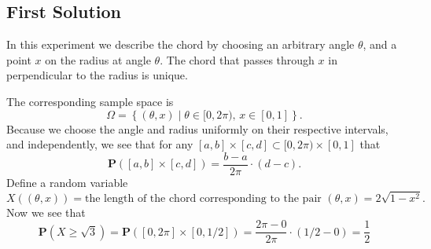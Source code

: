 \documentclass[11pt,a4paper]{article}
\theoremstyle{definition}
\theoremstyle{plain}
\newcommand{\set}[2]{ \left\{ #1 \mid #2 \right\} }
\begin{document}
  \subsection{First Solution}
    In this experiment we describe the chord by choosing an arbitrary angle
    $\theta$, and a point $x$ on the radius at angle $\theta$. The chord
    that passes through $x$ in perpendicular to the radius is unique.
    \begin{center}
    \end{center}
    The corresponding sample space is
    \[
      \Omega = \set{(\theta, x)}{ \theta \in [0, 2 \pi),\, x \in [0,1]}.
    \]
    Because we choose the angle and radius uniformly on their respective
    intervals, and independently, we see that for any 
    $[a,b] \times [c,d] \subset [0, 2 \pi) \times [0,1]$ that
    \[
      \mathbf P([a,b] \times [c,d]) = \frac{b-a}{2 \pi} \cdot (d-c).
    \]
    Define a random variable
    \[
      X\left((\theta, x)\right) = \text{the length of the chord corresponding
      to the pair $(\theta, x)$} = 2 \sqrt{1 - x^2}.
    \]
    Now we see that
    \[
      \mathbf P\left(X \geq \sqrt{3}\right) = 
      \mathbf P([0,2 \pi] \times [0,1/2]) =
      \frac{2 \pi-0}{2 \pi} \cdot (1/2-0) =
      \frac{1}{2}
    \]
  
\end{document}
